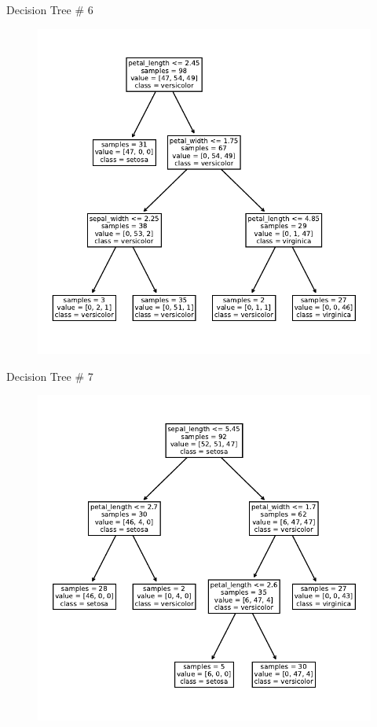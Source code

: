 \documentclass{beamer}
\begin{document}
\begin{frame}{Decision Tree \# 6}
  \begin{figure}
    \includegraphics[scale=0.7]{tree-6.pdf}
  \end{figure}
\end{frame}


\begin{frame}{Decision Tree \# 7}
  \begin{figure}
    \includegraphics[scale=0.7]{tree-7.pdf}
  \end{figure}
\end{frame}
\end{document}
